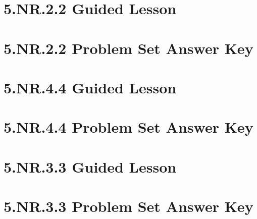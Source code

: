 \documentclass[a4paper,12pt]{article}
\begin{document}
\newpage
\section{5.NR.2.2 Guided Lesson}


\newpage
\section{5.NR.2.2 Problem Set Answer Key}


\newpage
\section{5.NR.4.4 Guided Lesson}


\newpage
\section{5.NR.4.4 Problem Set Answer Key}


\newpage
\section{5.NR.3.3 Guided Lesson}


\newpage
\section{5.NR.3.3 Problem Set Answer Key}

\end{document}
